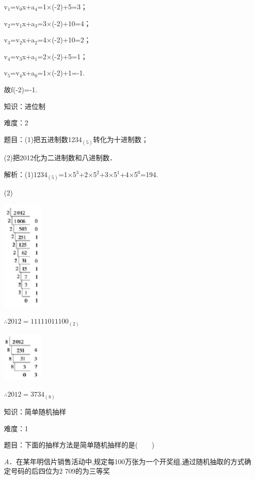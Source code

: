 \documentclass{article} %
\begin{document}
v${}_{1}$=v${}_{0}$x+a${}_{4}$=1$\mathrm{\times}$(-2)+5=3；

v${}_{2}$=v${}_{1}$x+a${}_{3}$=3$\mathrm{\times}$(-2)+10=4；

v${}_{3}$=v${}_{2}$x+a${}_{2}$=4$\mathrm{\times}$(-2)+10=2；

v${}_{4}$=v${}_{3}$x+a${}_{1}$=2$\mathrm{\times}$(-2)+5=1；

v${}_{5}$=v${}_{4}$x+a${}_{0}$=1$\mathrm{\times}$(-2)+1=-1.

故f(-2)=-1.

知识：进位制

难度：2

题目：(1)把五进制数1234${}_{(5)}$转化为十进制数；

(2)把2012化为二进制数和八进制数．

解析：(1)1234${}_{(5)}$=1$\mathrm{\times}$5${}^{3}$+2$\mathrm{\times}$5${}^{2}$+3$\mathrm{\times}$5${}^{1}$+4$\mathrm{\times}$5${}^{0}$=194.

(2)

\includegraphics*[width=0.79in, height=2.17in, keepaspectratio=false]{image77}

$\mathrm{\therefore}  2 012=111 110 111 00_{(2)}$

\includegraphics*[width=0.79in, height=0.98in, keepaspectratio=false]{image78}

$\mathrm{\therefore} 2 012=3 734_{(8)}$




知识：简单随机抽样

难度：1

题目：下面的抽样方法是简单随机抽样的是(　　)

\textit{A}．在某年明信片销售活动中,规定每100万张为一个开奖组,通过随机抽取的方式确定号码的后四位为2 709的为三等奖
\end{document}
